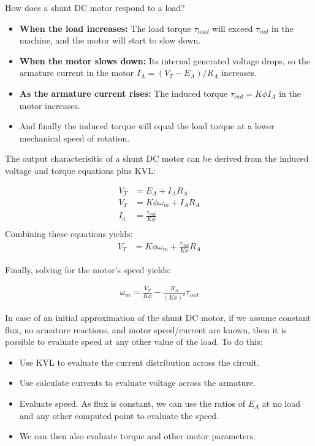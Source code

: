 \documentclass{book}
\begin{document}
How does a shunt DC motor respond to a load?
\begin{itemize}
	\item \textbf{When the load increases:}  The load torque $\tau_{load}$ will exceed $\tau_{ind}$ in the machine, and the motor will start to slow down. 
	\item \textbf{When the motor slows down:} Its internal generated voltage drops, so the armature current in the motor $I_A =(V_T - E_A)/R_A$ increases. 
	\item \textbf{As the armature current rises:} The induced torque $\tau_{ind} = K \phi I_A$ in the motor increases. 
	\item And finally the induced torque will equal the load torque at a lower mechanical speed of rotation.
\end{itemize}

The output characterisitic of a shunt DC motor can be derived from the induced voltage and torque equations plus KVL:

\begin{align*}
	V_T &= E_A + I_A R_A \\
	V_T &= K \phi \omega_m + I_A R_A \\
	I_a &= \frac{\tau_{ind}}{K\phi} \\
\end{align*}
Combining these equations yields:
\begin{align*}
	V_T &= K \phi \omega_m + \frac{\tau_{ind}}{K \phi} R_A
\end{align*}

Finally, solving for the motor's speed yields:

\begin{align*}
	\omega_m = \frac{V_T}{K \phi} - \frac{R_A}{(K\phi)^2}\tau_{ind}
\end{align*}

In case of an initial approximation of the shunt DC motor, if we assume constant flux, no armature reactions, and motor speed/current are known, then it is possible to evaluate speed at any other value of the load. To do this:

\begin{itemize}
	\item Use KVL to evaluate the current distribution across the circuit. 
	\item Use calculate currents to evaluate voltage across the armature. 
	\item Evaluate speed. As flux is constant, we can use the ratios of $E_A$ at no load and any other computed point to evaluate the speed. 
	\item We can then also evaluate torque and other motor parameters.
\end{itemize}
\end{document}
